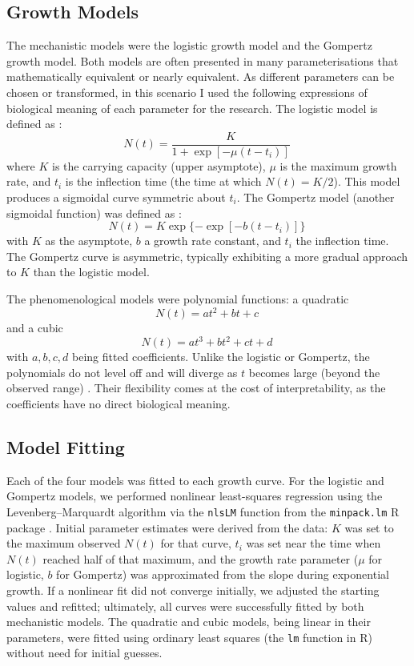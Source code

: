 \documentclass[11pt]{article}
\begin{document}
\subsection{Growth Models}
The mechanistic models were the logistic growth model and the Gompertz growth model. Both models are often presented in many parameterisations that mathematically equivalent or nearly equivalent. As different parameters can be chosen or transformed, in this scenario I used the following expressions of biological meaning of each parameter for the research. The logistic model is defined as \citep{Verhulst1838}:
\[
N(t) = \frac{K}{1 + \exp[-\mu (t - t_i)]}~
\]
where $K$ is the carrying capacity (upper asymptote), $\mu$ is the maximum growth rate, and $t_i$ is the inflection time (the time at which $N(t)=K/2$). This model produces a sigmoidal curve symmetric about $t_i$. The Gompertz model (another sigmoidal function) was defined as \citep{ZwieteringEtAl1990}:
\[
N(t) = K \exp\{-\exp[-b (t - t_i)]\}~
\]
with $K$ as the asymptote, $b$ a growth rate constant, and $t_i$ the inflection time. The Gompertz curve is asymmetric, typically exhibiting a more gradual approach to $K$ than the logistic model.

The phenomenological models were polynomial functions: a quadratic 
\[
N(t) = at^2 + bt + c~
\]
and a cubic 
\[
N(t) = at^3 + bt^2 + ct + d~
\]
with $a, b, c, d$ being fitted coefficients. Unlike the logistic or Gompertz, the polynomials do not level off and will diverge as $t$ becomes large (beyond the observed range) \citep{MotulskyChristopoulos2004}. Their flexibility comes at the cost of interpretability, as the coefficients have no direct biological meaning.

\subsection{Model Fitting}
Each of the four models was fitted to each growth curve. For the logistic and Gompertz models, we performed nonlinear least-squares regression using the Levenberg--Marquardt algorithm via the \texttt{nlsLM} function from the \texttt{minpack.lm} R package \citep{ElzhovEtAl2023}. Initial parameter estimates were derived from the data: $K$ was set to the maximum observed $N(t)$ for that curve, $t_i$ was set near the time when $N(t)$ reached half of that maximum, and the growth rate parameter ($\mu$ for logistic, $b$ for Gompertz) was approximated from the slope during exponential growth. If a nonlinear fit did not converge initially, we adjusted the starting values and refitted; ultimately, all curves were successfully fitted by both mechanistic models. The quadratic and cubic models, being linear in their parameters, were fitted using ordinary least squares (the \texttt{lm} function in R) without need for initial guesses. 
\end{document}
